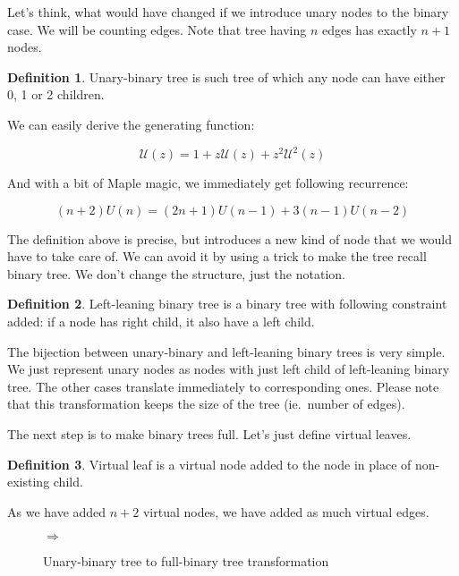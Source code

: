 \documentclass[final]{article}
\theoremstyle{definition}
\newtheorem{definition}{Definition}[subsection]
\theoremstyle{remark}
\newcommand{\gf}[1]{\ensuremath{\mathcal{#1}}}
\newcommand{\includeinlinesvg}[2]{\begin{minipage}{#1\textwidth}\end{minipage}}
\begin{document}
Let's think, what would have changed if we introduce unary nodes to the binary case\cite{motzkin}. We will be counting edges. Note that tree having \(n\) edges has exactly \(n + 1\) nodes.

\begin{definition}
    Unary-binary tree is such tree of which any node can have either 0, 1 or 2 children.
\end{definition}

We can easily derive the generating function:

\[\gf{U}(z) = 1 + z\gf{U}(z) + z^2 \gf{U}^2(z)\]

And with a bit of Maple magic, we immediately get following recurrence:

\[(n + 2)U(n) = (2n + 1)U(n - 1) + 3(n - 1)U(n - 2)\]

The definition above is precise, but introduces a new kind of node that we would have to take care of. We can avoid it by using a trick to make the tree recall binary tree. We don't change the structure, just the notation.

\begin{definition}
    \label{def:unary_binary_2}
    Left-leaning binary tree is a binary tree with following constraint added: if a node has right child, it also have a left child.
\end{definition}

The bijection between unary-binary and left-leaning binary trees is very simple. We just represent unary nodes as nodes with just left child of left-leaning binary tree. The other cases translate immediately to corresponding ones. Please note that this transformation keeps the size of the tree (ie.~number of edges).

The next step is to make binary trees full. Let's just define virtual leaves.

\begin{definition}
    Virtual leaf is a virtual node added to the node in place of non-existing child.
\end{definition}

As we have added \(n + 2\) virtual nodes, we have added as much virtual edges.

\begin{figure}[h]
    \centering
    \includeinlinesvg{.2}{unary_binary_base}%
    \(\Rightarrow\)%
    \includeinlinesvg{.3}{unary_binary_full}
    \caption{Unary-binary tree to full-binary tree transformation}
    \label{fig:unary_binary_transformation}
\end{figure}
\end{document}
